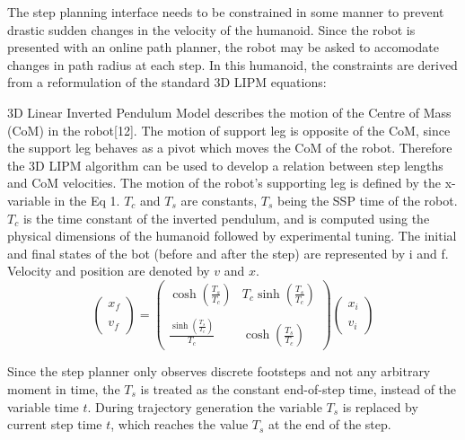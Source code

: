 \documentclass[letterpaper, 10 pt, conference]{ieeeconf}  %
\begin{document}
The step planning interface needs to be constrained in some manner to prevent drastic sudden changes in the velocity of the humanoid. Since the robot is presented with an online path planner, the robot may be asked to accomodate changes in path radius at each step.
In this humanoid, the constraints are derived from a reformulation of the standard 3D LIPM equations:

3D Linear Inverted Pendulum Model describes the motion of the Centre of Mass (CoM) in the robot[12]. The motion of support leg is opposite of the CoM, since the support leg behaves as a pivot which moves the CoM of the robot. Therefore the 3D LIPM algorithm can be used to develop a relation between step lengths and CoM velocities. The motion of the robot's supporting leg is defined by the x-variable in the Eq 1. $T_{c}$ and $T_{s}$ are constants, $T_{s}$ being the SSP time of the robot. $T_{c}$  is the time constant of the inverted pendulum, and is computed using the physical dimensions of the humanoid followed by experimental tuning. The initial and final states of the bot (before and after the step) are represented by i and f. Velocity and position are denoted by $v$ and $x$.
\\

\begin{equation}
\left(\begin{array}{c}x_{f}\\\\ v_{f}\end{array}\right)=\left(\begin{array}{cc}\cosh\left(\frac{T_{s}}{T_{c}}\right) & T_{c}\sinh\left(\frac{T_{s}}{T_{c}}\right) \\\\ \frac{\sinh\left(\frac{T_{s}}{T_{c}}\right)}{T_{c}} & \cosh\left(\frac{T_{s}}{T_{c}}\right)\end{array}\right)\left(\begin{array}{c}x_{i}\\\\ v_{i}\end{array}\right)
\end{equation}

Since the step planner only observes discrete footsteps and not any arbitrary moment in time, the $T_{s}$ is treated as the constant end-of-step time, instead of the variable time $t$. During trajectory generation the variable $T_{s}$ is replaced by current step time $t$, which reaches the value $T_{s}$ at the end of the step.
\end{document}
